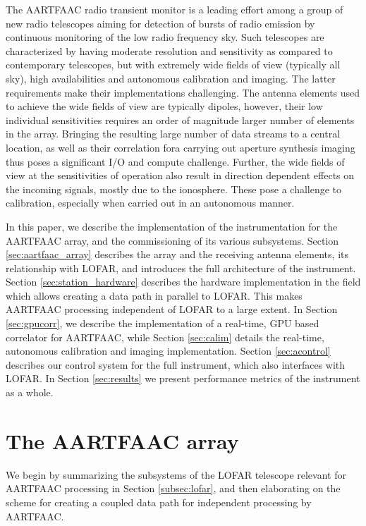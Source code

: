 \documentclass{aa}
\begin{document}
The AARTFAAC radio  transient monitor is a  leading effort among a  group of new
radio telescopes aiming for detection of  bursts of radio emission by continuous
monitoring of the low radio frequency sky.  Such telescopes are characterized by
having  moderate   resolution  and  sensitivity  as   compared  to  contemporary
telescopes, but  with extremely wide  fields of  view (typically all  sky), high
availabilities and autonomous calibration  and imaging.  The latter requirements
make their implementations challenging. The antenna elements used to achieve the
wide  fields  of view  are  typically  dipoles,  however, their  low  individual
sensitivities requires  an order of magnitude  larger number of elements  in the
array.   Bringing the  resulting  large  number of  data  streams  to a  central
location,  as well  as their  correlation fora  carrying out  aperture synthesis
imaging thus  poses a significant I/O  and compute challenge. Further,  the wide
fields  of view  at  the sensitivities  of operation  also  result in  direction
dependent effects on  the incoming signals, mostly due to  the ionosphere. These
pose a  challenge to calibration, especially  when carried out in  an autonomous
manner.  

In this  paper, we describe  the implementation  of the instrumentation  for the
AARTFAAC  array,  and the  commissioning  of  its various  subsystems.   Section
\ref{sec:aartfaac_array} describes the array and the receiving antenna elements,
its  relationship  with LOFAR,  and  introduces  the  full architecture  of  the
instrument.    Section   \ref{sec:station_hardware}   describes   the   hardware
implementation in  the field which  allows creating a  data path in  parallel to
LOFAR. This  makes AARTFAAC processing independent  of LOFAR to a  large extent.
In Section \ref{sec:gpucorr}, we describe the implementation of a real-time, GPU
based  correlator  for  AARTFAAC,  while  Section  \ref{sec:calim}  details  the
real-time,   autonomous  calibration   and   imaging  implementation.    Section
\ref{sec:acontrol} describes our  control system for the  full instrument, which
also interfaces with LOFAR.  In Section \ref{sec:results} we present performance
metrics of the instrument as a whole.

\section {\label{sec:aartfaac_array}The AARTFAAC array}
We  begin by  summarizing the  subsystems of  the LOFAR  telescope relevant  for
AARTFAAC processing in  Section \ref{subsec:lofar}, and then  elaborating on the
scheme for creating a coupled data path for independent processing by AARTFAAC.
\end{document}
